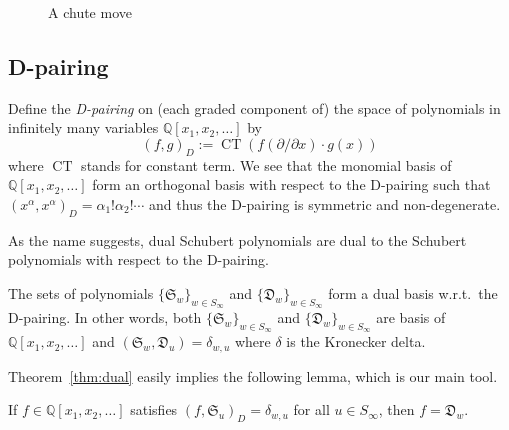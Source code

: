 \documentclass[10pt]{amsart}
\newcommand{\D}{\mathfrak{D}}
\newcommand{\Q}{\mathbb{Q}}
\DeclareMathOperator{\CT}{CT}
\begin{document}
\begin{figure}[htb]
\centering
{}
\caption{A chute move}
\label{fig:chute}
\end{figure}


\subsection{D-pairing}
Define the \emph{D-pairing} on (each graded component of) the space of polynomials in infinitely many variables $\Q[x_1,x_2,\ldots]$ by
\[
(f,g)_D:=\CT(f(\partial/\partial x)\cdot g(x))
\]
where $\CT$ stands for constant term. We see that the monomial basis of $\Q[x_1,x_2,\ldots]$ form an orthogonal basis with respect to the D-pairing such that $(x^{\alpha},x^{\alpha})_D=\alpha_1!\alpha_2!\cdots$ and thus the D-pairing is symmetric and non-degenerate.

As the name suggests, dual Schubert polynomials are dual to the Schubert polynomials with respect to the D-pairing.
\begin{theorem}\label{thm:dual}
The sets of polynomials $\{\mathfrak{S}_w\}_{w\in S_{\infty}}$ and $\{\D_w\}_{w\in S_{\infty}}$ form a dual basis w.r.t.\ the D-pairing. In other words, both $\{\mathfrak{S}_w\}_{w\in S_{\infty}}$ and $\{\D_w\}_{w\in S_{\infty}}$ are basis of $\Q[x_1,x_2,\ldots]$ and $(\mathfrak{S}_w,\D_u)=\delta_{w,u}$ where $\delta$ is the Kronecker delta. 
\end{theorem}
Theorem~\ref{thm:dual} easily implies the following lemma, which is our main tool.
\begin{lemma}\label{lem:basis}
If $f\in\Q[x_1,x_2,\ldots]$ satisfies $(f,\mathfrak{S}_u)_D=\delta_{w,u}$ for all $u\in S_{\infty}$, then $f=\D_w$.
\end{lemma}
\end{document}
